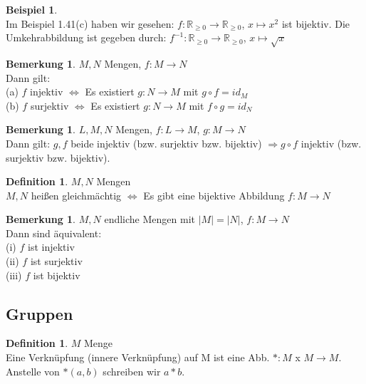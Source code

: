\documentclass[10pt,a4paper,numbers=endperiod]{scrartcl}
\theoremstyle{definition}
\newtheorem{defi}[satz]{Definition}
\newtheorem{bem}[satz]{Bemerkung}
\newtheorem{bsp}[satz]{Beispiel}
\begin{document}
\begin{bsp}
	$ $ \\
	Im Beispiel 1.41(c) haben wir gesehen: $f: \mathbb{R}_{\geq 0} \rightarrow \mathbb{R}_{\geq 0}$, $x \mapsto x^{2}$ ist bijektiv. Die Umkehrabbildung ist gegeben durch: $f^{-1}: \mathbb{R}_{\geq 0} \rightarrow \mathbb{R}_{\geq 0}$, $x \mapsto \sqrt{x}$
\end{bsp}

\begin{bem}
	$M,N$ Mengen, $f: M \rightarrow N$\\
	Dann gilt:\\
	(a) $f$ injektiv $\Leftrightarrow$ Es existiert $g: N \rightarrow M$ mit $g \circ f = id_M$\\
	(b) $f$ surjektiv $\Leftrightarrow$ Es existiert $g: N \rightarrow M$ mit $f \circ g = id_N$
\end{bem}

\begin{bem}
	$L,M,N$ Mengen, $f: L \rightarrow M$, $g: M \rightarrow N$\\
	Dann gilt: $g,f$ beide injektiv (bzw. surjektiv bzw. bijektiv) $\Rightarrow g \circ f$ injektiv (bzw. surjektiv bzw. bijektiv).
\end{bem}

\begin{defi}
	$M,N$ Mengen\\
	$M,N$ heißen gleichmächtig $\Leftrightarrow$ Es gibt eine bijektive Abbildung $f: M \rightarrow N$
\end{defi}

\begin{bem}
	$M,N$ endliche Mengen mit $|M| = |N|$, $f: M \rightarrow N$\\
	Dann sind äquivalent:\\
	(i) $f$ ist injektiv\\
	(ii) $f$ ist surjektiv\\
	(iii) $f$ ist bijektiv
\end{bem}

\subsection{Gruppen}

\begin{defi}
	$M$ Menge\\
	Eine Verknüpfung (innere Verknüpfung) auf M ist eine Abb. $*: M$ x $M \rightarrow M$.\\ Anstelle von $*(a,b)$ schreiben wir $a*b$.
\end{defi}
\end{document}
